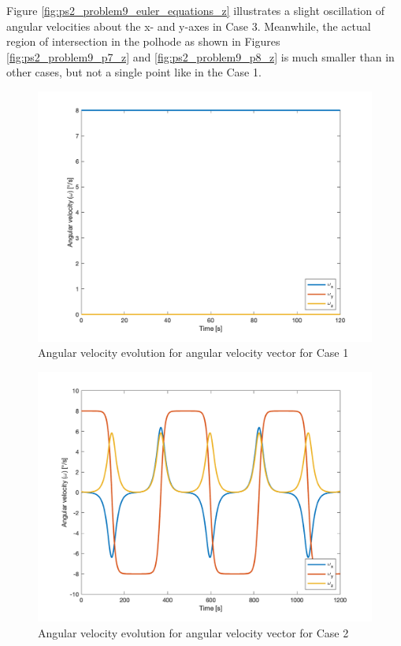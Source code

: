 Figure \ref{fig:ps2_problem9_euler_equations_z} illustrates a slight oscillation of angular velocities about the x- and y-axes in Case 3. Meanwhile, the actual region of intersection in the polhode as shown in Figures \ref{fig:ps2_problem9_p7_z} and \ref{fig:ps2_problem9_p8_z} is much smaller than in other cases, but not a single point like in the Case 1.

\begin{figure}[H]
\centering
\includegraphics[scale=0.6]{Images/ps2_problem9_euler_equations_x.png}
\caption{Angular velocity evolution for angular velocity vector for Case 1}
\label{fig:ps2_problem9_euler_equations_x}
\end{figure}

\begin{figure}[H]
\centering
\includegraphics[scale=0.6]{Images/ps2_problem9_euler_equations_y.png}
\caption{Angular velocity evolution for angular velocity vector for Case 2}
\label{fig:ps2_problem9_euler_equations_y}
\end{figure}

